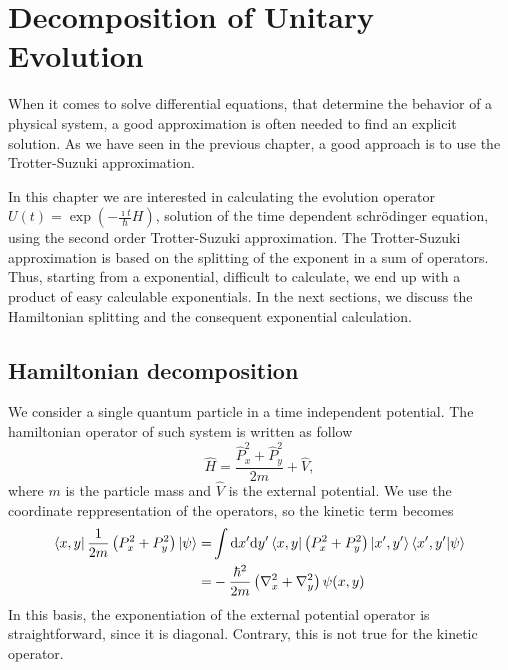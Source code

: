 \chapter{Decomposition of Unitary Evolution}
When it comes to solve differential equations, that determine the behavior of a physical system, a good approximation is often needed to find an explicit solution. As we have seen in the previous chapter, a good approach is to use the Trotter-Suzuki approximation. 

In this chapter we are interested in calculating the evolution operator $U(t) = \exp \left( - \frac{\imath t}{\hbar} H \right)$, solution of the time dependent schr\"odinger equation, using the second order Trotter-Suzuki approximation. The Trotter-Suzuki approximation is based on the splitting of the exponent in a sum of operators. Thus, starting from a exponential, difficult to calculate, we end up with a product of easy calculable exponentials. In the next sections, we discuss the Hamiltonian splitting and the consequent exponential calculation.

\section{Hamiltonian decomposition}
We consider a single quantum particle in a time independent potential. The hamiltonian operator of such system is written as follow
\begin{equation} \label{eq:hamiltonian-implementation}
\hat{H} = \frac{\hat{P}_x^2 + \hat{P}_y^2}{2m} + \hat{V},
\end{equation}
where $m$ is the particle mass and $\hat{V}$ is the external potential.
We use the coordinate reppresentation of the operators, so the kinetic term becomes
\begin{subequations}
\begin{align}
\bra{x,y} \frac{1}{2m} \left( P_x^2 + P_y^2 \right) \ket{\psi} = & \int \mathrm{d}x' \mathrm{d}y' \bra{x,y} \left( P_x^2 + P_y^2 \right) \ket{x',y'} \braket{x',y'|\psi} \label{eq:tot-momentum1} \\
= & - \frac{\hbar^2}{2m} \left( \nabla_x^2 + \nabla_y^2 \right) \psi(x,y) \label{eq:tot_momentum}
\end{align}
\end{subequations}
In this basis, the exponentiation of the external potential operator is straightforward, since it is diagonal. Contrary, this is not true for the kinetic operator.


